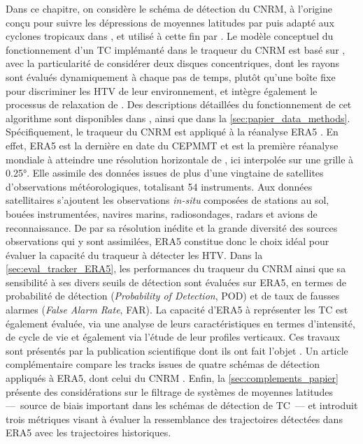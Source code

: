 \documentclass[../main.tex]{subfiles}
\begin{document}
Dans ce chapitre, on considère le schéma de détection du CNRM, à l'origine conçu pour suivre les dépressions de moyennes latitudes par
\cite{ayrault_nouvelle_2000} puis adapté aux cyclones tropicaux dans \cite{chauvin_response_2006}, et utilisé à cette fin par
\cite{daloz_impact_2012,chauvin_atlantic_2017,chauvin_future_2020,cattiaux_projected_2020}. Le modèle conceptuel du fonctionnement d'un TC implémanté dans le
traqueur du CNRM est basé sur \cite{bengtsson_hurricanetype_1995}, avec la particularité de considérer deux disques concentriques, dont les rayons sont évalués
dynamiquement à chaque pas de temps, plutôt qu'une boîte fixe pour discriminer les HTV de leur environnement, et intègre également le processus de relaxation de
\cite{camargo_improving_2002}. Des descriptions détaillées du fonctionnement de cet algorithme sont disponibles dans \cite{chauvin_response_2006}, ainsi que
dans la \cref{sec:papier_data_methods}. Spécifiquement, le traqueur du CNRM est appliqué à la réanalyse ERA5 \parencite{hersbach_era5_2020}. En effet, ERA5 est
la dernière en date du CEPMMT et est la première réanalyse mondiale à atteindre une résolution horizontale de , ici interpolée sur une grille à
\ang{0.25}. Elle assimile des données issues de plus d'une vingtaine de satellites d'observations météorologiques, totalisant \num{54} instruments. Aux données
satellitaires s'ajoutent les observations \textit{in-situ} composées de stations au sol, bouées instrumentées, navires marins, radiosondages, radars et avions
de reconnaissance. De par sa résolution inédite et la grande diversité des sources observations qui y sont assimilées, ERA5 constitue donc le choix idéal pour
évaluer la capacité du traqueur à détecter les HTV. Dans la \cref{sec:eval_tracker_ERA5}, les performances du traqueur du CNRM ainsi que sa sensibilité à ses
divers seuils de détection sont évaluées sur ERA5, en termes de probabilité de détection (\textit{Probability of Detection}, POD) et de taux de fausses alarmes
(\textit{False Alarm Rate}, FAR). La capacité d'ERA5 à représenter les TC est également évaluée, via une analyse de leurs caractéristiques en termes
d'intensité, de cycle de vie et également via l'étude de leur profiles verticaux. Ces travaux sont présentés par la publication scientifique dont ils ont fait
l'objet \parencite{dulac_assessing_2023}. Un article complémentaire compare les tracks issues de quatre schémas de détection appliqués à ERA5, dont celui du
CNRM \parencite{bourdin_intercomparison_2022}. Enfin, la \cref{sec:complements_papier} présente des considérations sur le filtrage de systèmes de moyennes
latitudes ---~source de biais important dans les schémas de détection de TC~--- et introduit trois métriques visant à évaluer la ressemblance des trajectoires
détectées dans ERA5 avec les trajectoires historiques.
\end{document}
